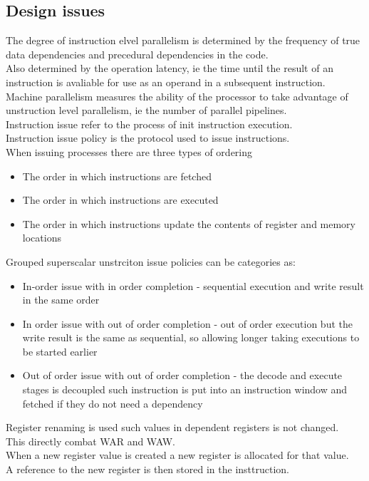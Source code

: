 \documentclass[12pt, a4paper]{article}
\begin{document}
		\subsection{Design issues}
			The degree of instruction elvel parallelism is determined by the frequency of true data dependencies and precedural dependencies in the code.\\
			Also determined by the operation latency, ie the time until the result of an instruction is avaliable for use as an operand in a subsequent instruction.\\
			Machine parallelism measures the ability of the processor to take advantage of unstruction level parallelism, ie the number of parallel pipelines.\\
			Instruction issue refer to the process of init instruction execution.\\
			Instruction issue policy is the protocol used to issue instructions.\\
			When issuing processes there are three types of ordering
			\begin{itemize}
				\item The order in which instructions are fetched
				\item The order in which instructions are executed
				\item The order in which instructions update the contents of register and memory locations
			\end{itemize}
			Grouped superscalar unstrciton issue policies can be categories as:
			\begin{itemize}
				\item In-order issue with in order completion - sequential execution and write result in the same order
				\item In order issue with out of order completion - out of order execution but the write result is the same as sequential, so allowing longer taking executions to be started earlier
				\item Out of order issue with out of order completion - the decode and execute stages is decoupled such instruction is put into an instruction window and fetched if they do not need a dependency
			\end{itemize}
			Register renaming is used such values in dependent registers is not changed.\\
			This directly combat WAR and WAW.\\
			When a new register value is created a new register is allocated for that value.\\
			A reference to the new register is then stored in the insttruction.
\end{document}
